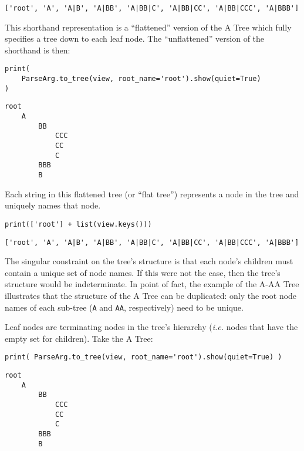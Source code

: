 \documentclass[10pt]{amsart}
\numberwithin{equation}{section}
\begin{document}
\begin{verbatim}
['root', 'A', 'A|B', 'A|BB', 'A|BB|C', 'A|BB|CC', 'A|BB|CCC', 'A|BBB']
\end{verbatim}


This shorthand representation is a ``flattened'' version of the A Tree which fully
specifies a tree down to each leaf node. The ``unflattened'' version of the
shorthand is then:
\begin{verbatim}
print(
    ParseArg.to_tree(view, root_name='root').show(quiet=True) 
)
\end{verbatim}

\begin{verbatim}
root
    A
        BB
            CCC
            CC
            C
        BBB
        B
\end{verbatim}


Each string in this flattened tree (or ``flat tree'') represents a node in the
tree and uniquely names that node.
\begin{verbatim}
print(['root'] + list(view.keys()))
\end{verbatim}

\begin{verbatim}
['root', 'A', 'A|B', 'A|BB', 'A|BB|C', 'A|BB|CC', 'A|BB|CCC', 'A|BBB']
\end{verbatim}


The singular constraint on the tree's structure is that each node's children must contain
a unique set of node names.  If this were not the case, then the tree's structure would
be indeterminate.  In point of fact, the example of the A-AA Tree illustrates that the
structure of the A Tree can be duplicated: only the root node names of each sub-tree
(\texttt{A} and \texttt{AA}, respectively) need to be unique.

Leaf nodes are terminating nodes in the tree's hierarchy (\emph{i.e.} nodes that
have the empty set for children). Take the A Tree:
\begin{verbatim}
print( ParseArg.to_tree(view, root_name='root').show(quiet=True) )
\end{verbatim}

\begin{verbatim}
root
    A
        BB
            CCC
            CC
            C
        BBB
        B
\end{verbatim}
\end{document}
